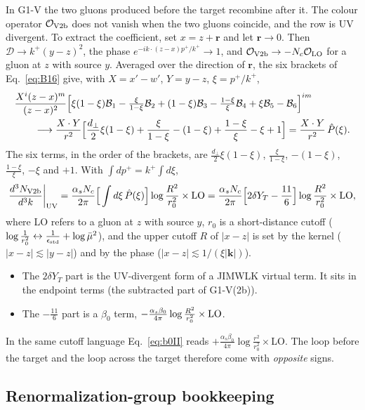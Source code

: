 In G1-V the two gluons produced before the target recombine after it. The colour operator $\mathcal{O}_{\rm V2b}$ does not vanish when the two gluons coincide, and the row is UV divergent. To extract the coefficient, set $x=z+\mathbf r$ and let $\mathbf r\to0$. Then $\mathcal D\to k^+(y-z)^2$, the phase $e^{-ik\cdot(z-x)p^+/k^+}\to1$, and $\mathcal{O}_{\rm V2b}\to-N_c\mathcal{O}_{\rm LO}$ for a gluon at $z$ with source $y$. Averaged over the direction of $\mathbf r$, the six brackets of Eq.~\eqref{eq:B16} give, with $X=x'-w'$, $Y=y-z$, $\xi=p^+/k^+$,
\begin{align}
&\frac{X^i(z-x)^m}{(z-x)^2}\Big[\xi(1-\xi)\mathcal B_1-\tfrac{\xi}{1-\xi}\mathcal B_2+(1-\xi)\mathcal B_3-\tfrac{1-\xi}{\xi}\mathcal B_4+\xi\mathcal B_5-\mathcal B_6\Big]^{im}\notag\\
&\qquad\longrightarrow\frac{X\cdot Y}{r^2}\Big[\frac{d_\perp}{2}\xi(1-\xi)+\frac{\xi}{1-\xi}-(1-\xi)+\frac{1-\xi}{\xi}-\xi+1\Big]=\frac{X\cdot Y}{r^2}\,\hat P(\xi).
\end{align}
The six terms, in the order of the brackets, are $\frac{d_\perp}{2}\xi(1-\xi)$, $\frac{\xi}{1-\xi}$, $-(1-\xi)$, $\frac{1-\xi}{\xi}$, $-\xi$ and $+1$. With $\int dp^+=k^+\int d\xi$,
\begin{equation}
\frac{d^3N_{\rm V2b}}{d^3k}\bigg|_{\rm UV}=\frac{\alpha_sN_c}{2\pi}\Big[\int d\xi\,\hat P(\xi)\Big]\log\frac{R^2}{r_0^2}\times{\rm LO}=\frac{\alpha_sN_c}{2\pi}\Big[2\delta Y_T-\frac{11}{6}\Big]\log\frac{R^2}{r_0^2}\times{\rm LO},
\label{eq:2bUV}
\end{equation}
where LO refers to a gluon at $z$ with source $y$, $r_0$ is a short-distance cutoff ($\log\frac{1}{r_0^2}\leftrightarrow\frac{1}{\epsilon_{\rm std}}+\log\bar\mu^2$), and the upper cutoff $R$ of $|x-z|$ is set by the kernel ($|x-z|\lesssim|y-z|$) and by the phase ($|x-z|\lesssim1/(\xi|\mathbf k|)$).
\begin{itemize}
\item The $2\delta Y_T$ part is the UV-divergent form of a JIMWLK virtual term. It sits in the endpoint terms (the subtracted part of G1-V(2b)).
\item The $-\frac{11}{6}$ part is a $\beta_0$ term, $-\frac{\alpha_s\beta_0}{4\pi}\log\frac{R^2}{r_0^2}\times{\rm LO}$.
\end{itemize}
In the same cutoff language Eq.~\eqref{eq:b0II} reads $+\frac{\alpha_s\beta_0}{4\pi}\log\frac{r^2}{r_0^2}\times$LO. The loop before the target and the loop across the target therefore come with \emph{opposite} signs.

\subsection{Renormalization-group bookkeeping}\label{sec:RG}

